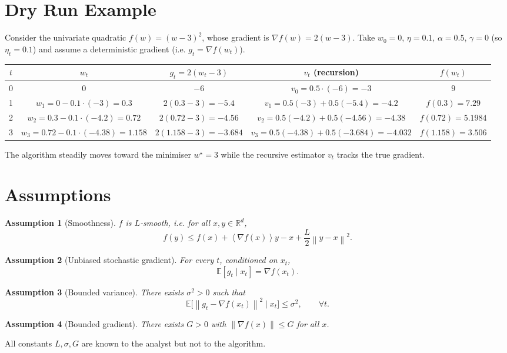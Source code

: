 \documentclass{article}
\newtheorem{assumption}{Assumption}
\newcommand{\E}{\mathbb{E}}
\newcommand{\norm}[1]{\left\|#1\right\|}
\newcommand{\inner}[1]{\left\langle#1\right\rangle}
\begin{document}
\section*{Dry Run Example}
Consider the univariate quadratic $f(w)=(w-3)^{2}$, whose gradient is $\nabla f(w)=2(w-3)$.  
Take $w_{0}=0$, $\eta=0.1$, $\alpha=0.5$, $\gamma=0$ (so $\eta_{t}=0.1$) and assume a deterministic gradient (i.e. $g_{t}=\nabla f(w_{t})$).

\begin{center}
\begin{tabular}{c|c|c|c|c}
$t$ & $w_{t}$ & $g_{t}=2(w_{t}-3)$ & $v_{t}$ (recursion) & $f(w_{t})$\\ \hline
0 & $0$ & $-6$ & $v_{0}=0.5\cdot(-6)=-3$ & $9$\\
1 & $w_{1}=0-0.1\cdot(-3)=0.3$ & $2(0.3-3)=-5.4$ & $v_{1}=0.5(-3)+0.5(-5.4)=-4.2$ & $f(0.3)=7.29$\\
2 & $w_{2}=0.3-0.1\cdot(-4.2)=0.72$ & $2(0.72-3)=-4.56$ & $v_{2}=0.5(-4.2)+0.5(-4.56)=-4.38$ & $f(0.72)=5.1984$\\
3 & $w_{3}=0.72-0.1\cdot(-4.38)=1.158$ & $2(1.158-3)=-3.684$ & $v_{3}=0.5(-4.38)+0.5(-3.684)=-4.032$ & $f(1.158)=3.506$\\
\end{tabular}
\end{center}
The algorithm steadily moves toward the minimiser $w^{\star}=3$ while the recursive estimator $v_{t}$ tracks the true gradient.

\newpage
\section*{Assumptions}
\begin{assumption}[Smoothness]\label{as:smooth}
$f$ is $L$‑smooth, i.e. for all $x,y\in\mathbb{R}^{d}$,
\[
f(y)\le f(x)+\inner{\nabla f(x)}{y-x}+\frac{L}{2}\norm{y-x}^{2}.
\]
\end{assumption}
\begin{assumption}[Unbiased stochastic gradient]\label{as:unbiased}
For every $t$, conditioned on $x_{t}$,
\[
\E[g_{t}\mid x_{t}]=\nabla f(x_{t}).
\]
\end{assumption}
\begin{assumption}[Bounded variance]\label{as:variance}
There exists $\sigma^{2}>0$ such that
\[
\E\bigl[\norm{g_{t}-\nabla f(x_{t})}^{2}\mid x_{t}\bigr]\le\sigma^{2},
\qquad\forall t.
\]
\end{assumption}
\begin{assumption}[Bounded gradient]\label{as:boundedgrad}
There exists $G>0$ with $\norm{\nabla f(x)}\le G$ for all $x$.
\end{assumption}
All constants $L,\sigma,G$ are known to the analyst but not to the algorithm.
\end{document}
